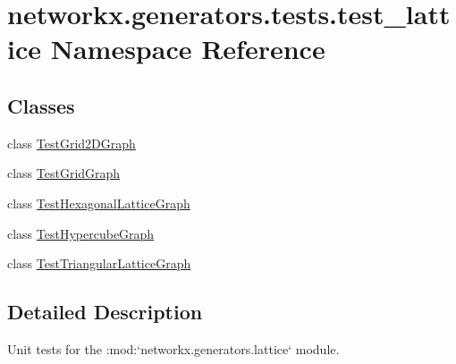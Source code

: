 \hypertarget{namespacenetworkx_1_1generators_1_1tests_1_1test__lattice}{}\section{networkx.\+generators.\+tests.\+test\+\_\+lattice Namespace Reference}
\label{namespacenetworkx_1_1generators_1_1tests_1_1test__lattice}
\subsection*{Classes}
\begin{DoxyCompactItemize}
\item 
class \hyperlink{classnetworkx_1_1generators_1_1tests_1_1test__lattice_1_1TestGrid2DGraph}{Test\+Grid2\+D\+Graph}
\item 
class \hyperlink{classnetworkx_1_1generators_1_1tests_1_1test__lattice_1_1TestGridGraph}{Test\+Grid\+Graph}
\item 
class \hyperlink{classnetworkx_1_1generators_1_1tests_1_1test__lattice_1_1TestHexagonalLatticeGraph}{Test\+Hexagonal\+Lattice\+Graph}
\item 
class \hyperlink{classnetworkx_1_1generators_1_1tests_1_1test__lattice_1_1TestHypercubeGraph}{Test\+Hypercube\+Graph}
\item 
class \hyperlink{classnetworkx_1_1generators_1_1tests_1_1test__lattice_1_1TestTriangularLatticeGraph}{Test\+Triangular\+Lattice\+Graph}
\end{DoxyCompactItemize}


\subsection{Detailed Description}
\begin{DoxyVerb}Unit tests for the :mod:`networkx.generators.lattice` module.\end{DoxyVerb}
 